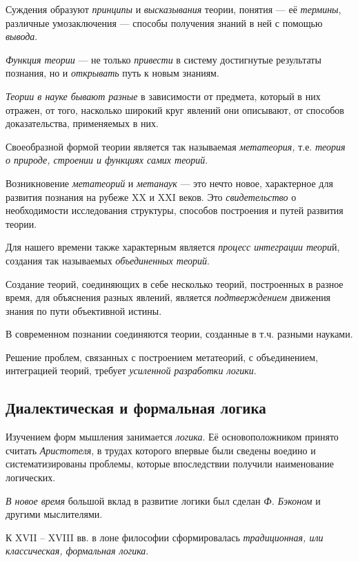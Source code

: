 \documentclass[a4paper,14pt,russian]{extreport}
\begin{document}
Суждения образуют \emph{принципы} и \emph{высказывания} теории, понятия --- её \emph{термины}, различные умозаключения --- способы получения знаний в ней с помощью \emph{вывода}.

\emph{Функция теории} --- не только \emph{привести} в систему достигнутые результаты познания, но и \emph{открывать} путь к новым знаниям.

\emph{Теории в науке бывают разные} в зависимости от предмета, который в них отражен, от того, насколько широкий круг явлений они описывают, от способов доказательства, применяемых в них.

Своеобразной формой теории является так называемая \emph{метатеория,} т.е. \emph{теория о природе, строении и функциях самих теорий}.

Возникновение \emph{метатеорий} и \emph{метанаук} --- это нечто новое, характерное для развития познания на рубеже XX и XXI веков. Это \emph{свидетельство} о необходимости исследования структуры, способов построения и путей развития теории.

Для нашего времени также характерным является \emph{процесс интеграции теори}й, создания так называемых \emph{объединенных теорий}.

Создание теорий, соединяющих в себе несколько теорий, построенных в разное время, для объяснения разных явлений, является \emph{подтверждением} движения знания по пути объективной истины.

В современном познании соединяются теории, созданные в т.ч. разными науками.

Решение проблем, связанных с построением метатеорий, с объединением, интеграцией теорий, требует \emph{усиленной разработки логики}.

\subsection{Диалектическая и формальная логика}

Изучением форм мышления занимается \emph{логика}. Её основоположником принято считать \emph{Аристотеля}, в трудах которого впервые были сведены воедино и систематизированы проблемы, которые впоследствии получили наименование логических.

\emph{В новое время} большой вклад в развитие логики был сделан \emph{Ф. Бэконом} и другими мыслителями.

К XVII -- XVIII вв. в лоне философии сформировалась \emph{традиционная, или классическая, формальная логика}.
\end{document}
